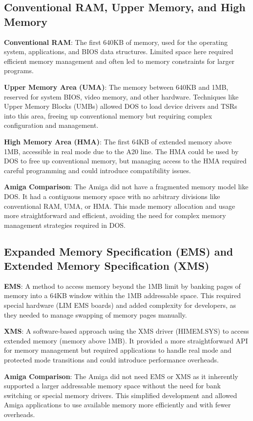 \documentclass[a4paper]{article}
\begin{document}
\subsection*{Conventional RAM, Upper Memory, and High Memory}
\begin{itemize}
  \begin{item}
    \textbf{Conventional RAM}: The first 640KB of memory, used for the operating system, applications, and BIOS data structures. Limited space here required efficient memory management and often led to memory constraints for larger programs.
  \end{item}
  \begin{item}
    \textbf{Upper Memory Area (UMA)}: The memory between 640KB and 1MB, reserved for system BIOS, video memory, and other hardware. Techniques like Upper Memory Blocks (UMBs) allowed DOS to load device drivers and TSRs into this area, freeing up conventional memory but requiring complex configuration and management.
  \end{item}
  \begin{item}
    \textbf{High Memory Area (HMA)}: The first 64KB of extended memory above 1MB, accessible in real mode due to the A20 line. The HMA could be used by DOS to free up conventional memory, but managing access to the HMA required careful programming and could introduce compatibility issues.
  \end{item}
\end{itemize}
\textbf{Amiga Comparison}: The Amiga did not have a fragmented memory model like DOS. It had a contiguous memory space with no arbitrary divisions like conventional RAM, UMA, or HMA. This made memory allocation and usage more straightforward and efficient, avoiding the need for complex memory management strategies required in DOS.
\subsection*{Expanded Memory Specification (EMS) and Extended Memory Specification (XMS)}
\begin{itemize}
  \begin{item}
    \textbf{EMS}: A method to access memory beyond the 1MB limit by banking pages of memory into a 64KB window within the 1MB addressable space. This required special hardware (LIM EMS boards) and added complexity for developers, as they needed to manage swapping of memory pages manually.
  \end{item}
  \begin{item}
    \textbf{XMS}: A software-based approach using the XMS driver (HIMEM.SYS) to access extended memory (memory above 1MB). It provided a more straightforward API for memory management but required applications to handle real mode and protected mode transitions and could introduce performance overheads.
  \end{item}
\end{itemize}
\textbf{Amiga Comparison}: The Amiga did not need EMS or XMS as it inherently supported a larger addressable memory space without the need for bank switching or special memory drivers. This simplified development and allowed Amiga applications to use available memory more efficiently and with fewer overheads.
\end{document}
